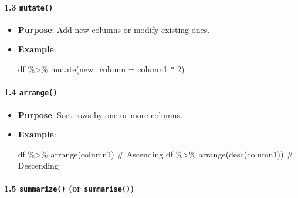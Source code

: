 \documentclass[
  letterpaper,
  DIV=11,
  numbers=noendperiod]{scrartcl}
\let\oldparagraph\paragraph
\renewcommand{\paragraph}[1]{\oldparagraph{#1}\mbox{}}
\newenvironment{Shaded}{\begin{snugshade}}{\end{snugshade}}
\newcommand{\AttributeTok}[1]{\textcolor[rgb]{0.40,0.45,0.13}{#1}}
\newcommand{\CommentTok}[1]{\textcolor[rgb]{0.37,0.37,0.37}{#1}}
\newcommand{\DecValTok}[1]{\textcolor[rgb]{0.68,0.00,0.00}{#1}}
\newcommand{\FunctionTok}[1]{\textcolor[rgb]{0.28,0.35,0.67}{#1}}
\newcommand{\NormalTok}[1]{\textcolor[rgb]{0.00,0.23,0.31}{#1}}
\newcommand{\SpecialCharTok}[1]{\textcolor[rgb]{0.37,0.37,0.37}{#1}}
\begin{document}
\paragraph{\texorpdfstring{\textbf{1.3
\texttt{mutate()}}}{1.3 mutate()}}\label{mutate}

\begin{itemize}
\item
  \textbf{Purpose}: Add new columns or modify existing ones.
\item
  \textbf{Example}:

\begin{Shaded}
\begin{Highlighting}[]
\NormalTok{df }\SpecialCharTok{\%\textgreater{}\%} \FunctionTok{mutate}\NormalTok{(}\AttributeTok{new\_column =}\NormalTok{ column1 }\SpecialCharTok{*} \DecValTok{2}\NormalTok{)}
\end{Highlighting}
\end{Shaded}
\end{itemize}

\paragraph{\texorpdfstring{\textbf{1.4
\texttt{arrange()}}}{1.4 arrange()}}\label{arrange}

\begin{itemize}
\item
  \textbf{Purpose}: Sort rows by one or more columns.
\item
  \textbf{Example}:

\begin{Shaded}
\begin{Highlighting}[]
\NormalTok{df }\SpecialCharTok{\%\textgreater{}\%} \FunctionTok{arrange}\NormalTok{(column1)  }\CommentTok{\# Ascending}
\NormalTok{df }\SpecialCharTok{\%\textgreater{}\%} \FunctionTok{arrange}\NormalTok{(}\FunctionTok{desc}\NormalTok{(column1))  }\CommentTok{\# Descending}
\end{Highlighting}
\end{Shaded}
\end{itemize}

\paragraph{\texorpdfstring{\textbf{1.5 \texttt{summarize()} (or
\texttt{summarise()})}}{1.5 summarize() (or summarise())}}\label{summarize-or-summarise}
\end{document}
